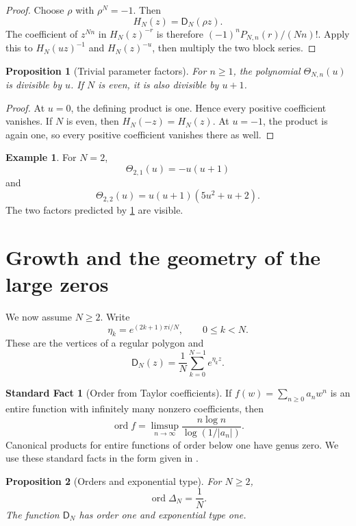 \documentclass{aomart}
\newtheorem{proposition}[proposition]{Proposition}
\theoremstyle{definition}
\newtheorem{example}[example]{Example}
\newtheorem{standardfact}[standardfact]{Standard Fact}
\theoremstyle{remark}
\newcommand{\Dfun}{\mathsf D}
\newcommand{\Thetafun}{\mathsf\Theta}
\newcommand{\ord}{\operatorname{ord}}
\begin{document}
\begin{proof}
Choose $\rho$ with $\rho^N=-1$.  Then
\[
H_N(z)=\Dfun_N(\rho z).
\]
The coefficient of $z^{Nn}$ in $H_N(z)^{-r}$ is therefore $(-1)^nP_{N,n}(r)/(Nn)!$.  Apply this to $H_N(uz)^{-1}$ and $H_N(z)^{-u}$, then multiply the two block series.
\end{proof}

\begin{proposition}[Trivial parameter factors]\label{prop:theta_factors}
For $n\geq1$, the polynomial $\Thetafun_{N,n}(u)$ is divisible by $u$.  If $N$ is even, it is also divisible by $u+1$.
\end{proposition}

\begin{proof}
At $u=0$, the defining product is one.  Hence every positive coefficient vanishes.  If $N$ is even, then $H_N(-z)=H_N(z)$.  At $u=-1$, the product is again one, so every positive coefficient vanishes there as well.
\end{proof}

\begin{example}\label{ex:theta_even}
For $N=2$,
\[
\Thetafun_{2,1}(u)=-u(u+1)
\]
and
\[
\Thetafun_{2,2}(u)
=
u(u+1)(5u^2+u+2).
\]
The two factors predicted by \cref{prop:theta_factors} are visible.
\end{example}

\section{Growth and the geometry of the large zeros}\label{sec:zero_geometry}

We now assume $N\geq2$.  Write
\[
\eta_k=e^{(2k+1)\pi i/N},
\qquad 0\leq k<N.
\]
These are the vertices of a regular polygon and
\[
\Dfun_N(z)=\frac1N\sum_{k=0}^{N-1}e^{\eta_kz}.
\]

\begin{standardfact}[Order from Taylor coefficients]\label{sf:coefficient_order}
If $f(w)=\sum_{n\geq0}a_nw^n$ is an entire function with infinitely many nonzero coefficients, then
\[
\ord f
=
\limsup_{n\to\infty}
\frac{n\log n}{\log(1/|a_n|)}.
\]
Canonical products for entire functions of order below one have genus zero.  We use these standard facts in the form given in \cite{Boas1954,Titchmarsh1939}.
\end{standardfact}

\begin{proposition}[Orders and exponential type]\label{prop:orders}
For $N\geq2$,
\[
\ord\Delta_N=\frac1N.
\]
The function $\Dfun_N$ has order one and exponential type one.
\end{proposition}
\end{document}
